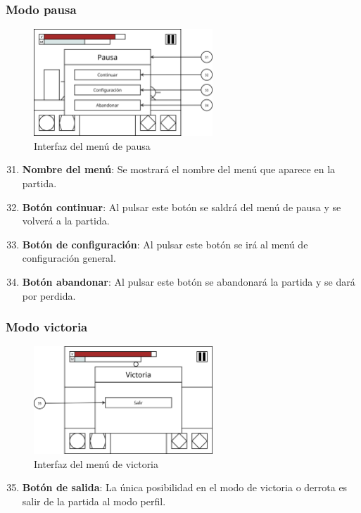 \subsubsection{Modo pausa}
\begin{figure}[H]
    \centering
    \includegraphics[width=0.6\textwidth]{5-Cuerpo/Chapter5/I7.png} %
    \caption{Interfaz del menú de pausa}
    \label{fig:Interface_Pausa}
\end{figure}
\begin{enumerate}\setcounter{enumi}{30}
    \item \textbf{Nombre del menú}: Se mostrará el nombre del menú que aparece
    en la partida.
    \item \textbf{Botón continuar}: Al pulsar este botón se saldrá del menú de
    pausa y se volverá a la partida.
    \item \textbf{Botón de configuración}: Al pulsar este botón se irá al menú
    de configuración general.
    \item \textbf{Botón abandonar}: Al pulsar este botón se abandonará la
    partida y se dará por perdida.
\end{enumerate}

\subsubsection{Modo victoria}
\begin{figure}[H]
    \centering
    \includegraphics[width=0.6\textwidth]{5-Cuerpo/Chapter5/I8.png} %
    \caption{Interfaz del menú de victoria}
    \label{fig:Interface_Victoria}
\end{figure}
\begin{enumerate}\setcounter{enumi}{34}
    \item \textbf{Botón de salida}: La única posibilidad en el modo de victoria
    o derrota es salir de la partida al modo perfil.
\end{enumerate}

